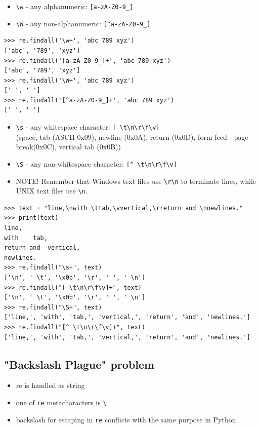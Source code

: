 \documentclass{beamer}
\begin{document}
\begin{frame}[fragile]
\begin{itemize}
\item \verb/\w/ - any alphanumeric: \verb/[a-zA-Z0-9_]/
\item \verb/\W/ - any non-alphanumeric: \verb/[^a-zA-Z0-9_]/
\end{itemize}
\begin{lstlisting}
>>> re.findall('\w+', 'abc 789 xyz')
['abc', '789', 'xyz']
>>> re.findall('[a-zA-Z0-9_]+', 'abc 789 xyz')
['abc', '789', 'xyz']
>>> re.findall('\W+', 'abc 789 xyz')
[' ', ' ']
>>> re.findall('[^a-zA-Z0-9_]+', 'abc 789 xyz')
[' ', ' ']
\end{lstlisting}
\end{frame}

\begin{frame}[fragile]
\begin{itemize}
\item \verb/\s/ - any whitespace character: \verb/[ \t\n\r\f\v]/ \\ (space, tab (ASCII 0x09), newline (0x0A), return (0x0D), form feed - page break(0x0C), vertical tab (0x0B))
\item \verb/\S/ - any non-whitespace character: \verb/[^ \t\n\r\f\v]/
\pause
\item NOTE! Remember that Windows text files use \verb/\r\n/ to terminate lines, while UNIX text files use \verb/\n/.
\end{itemize}
\end{frame}

\begin{frame}[fragile]
\begin{lstlisting}
>>> text = "line,\nwith \ttab,\vvertical,\rreturn and \nnewlines."
>>> print(text)
line,
with    tab,
return and  vertical,
newlines.
>>> re.findall("\s+", text)
['\n', ' \t', '\x0b', '\r', ' ', ' \n']
>>> re.findall("[ \t\n\r\f\v]+", text)
['\n', ' \t', '\x0b', '\r', ' ', ' \n']
>>> re.findall("\S+", text)
['line,', 'with', 'tab,', 'vertical,', 'return', 'and', 'newlines.']
>>> re.findall("[^ \t\n\r\f\v]+", text)
['line,', 'with', 'tab,', 'vertical,', 'return', 'and', 'newlines.']
\end{lstlisting}
\end{frame}

\subsection{"Backslash Plague" problem}
\begin{frame}[fragile]
\begin{itemize}
\item re is handled as string
\pause
\item one of \verb/re/ metacharacters is \verb/\/
\pause
\item backslash for escaping in \verb/re/ conflicts with the same purpose in Python
\end{itemize}
\end{frame}
\end{document}
